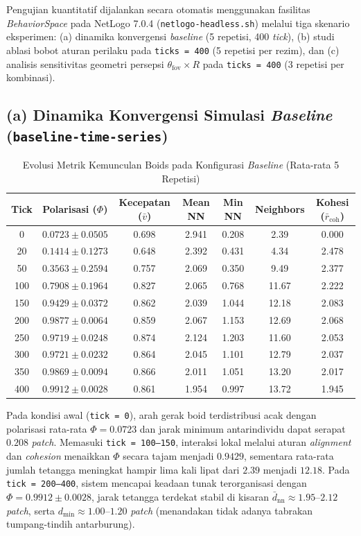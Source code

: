 \documentclass[11pt,a4paper]{article}
\begin{document}
Pengujian kuantitatif dijalankan secara otomatis menggunakan fasilitas \textit{BehaviorSpace} pada NetLogo 7.0.4 (\texttt{netlogo-headless.sh}) melalui tiga skenario eksperimen: (a) dinamika konvergensi \textit{baseline} (5 repetisi, 400 \textit{tick}), (b) studi ablasi bobot aturan perilaku pada \texttt{ticks = 400} (5 repetisi per rezim), dan (c) analisis sensitivitas geometri persepsi $\theta_{\text{fov}} \times R$ pada \texttt{ticks = 400} (3 repetisi per kombinasi).

\subsection*{(a) Dinamika Konvergensi Simulasi \textit{Baseline} (\texttt{baseline-time-series})}
\begin{table}[H]
\centering
\small
\setlength{\tabcolsep}{5pt}
\begin{tabular}{ccccccc}
\toprule
\textbf{Tick} & \textbf{Polarisasi ($\Phi$)} & \textbf{Kecepatan ($\bar{v}$)} & \textbf{Mean NN} & \textbf{Min NN} & \textbf{Neighbors} & \textbf{Kohesi ($\bar{r}_{\text{coh}}$)} \\
\midrule
0   & $0.0723 \pm 0.0505$ & 0.698 & 2.941 & 0.208 & 2.39  & 0.000 \\
20  & $0.1414 \pm 0.1273$ & 0.648 & 2.392 & 0.431 & 4.34  & 2.478 \\
50  & $0.3563 \pm 0.2594$ & 0.757 & 2.069 & 0.350 & 9.49  & 2.377 \\
100 & $0.7908 \pm 0.1964$ & 0.827 & 2.065 & 0.768 & 11.67 & 2.222 \\
150 & $0.9429 \pm 0.0372$ & 0.862 & 2.039 & 1.044 & 12.18 & 2.083 \\
200 & $0.9877 \pm 0.0064$ & 0.859 & 2.067 & 1.153 & 12.69 & 2.068 \\
250 & $0.9719 \pm 0.0248$ & 0.874 & 2.124 & 1.203 & 11.60 & 2.053 \\
300 & $0.9721 \pm 0.0232$ & 0.864 & 2.045 & 1.101 & 12.79 & 2.037 \\
350 & $0.9869 \pm 0.0094$ & 0.866 & 2.011 & 1.051 & 13.20 & 2.017 \\
400 & $0.9912 \pm 0.0028$ & 0.861 & 1.954 & 0.997 & 13.72 & 1.945 \\
\bottomrule
\end{tabular}
\caption{Evolusi Metrik Kemunculan Boids pada Konfigurasi \textit{Baseline} (Rata-rata 5 Repetisi)}
\label{tab:baseline}
\end{table}

Pada kondisi awal (\texttt{tick = 0}), arah gerak boid terdistribusi acak dengan polarisasi rata-rata $\Phi = 0.0723$ dan jarak minimum antarindividu dapat serapat $0.208$ \textit{patch}. Memasuki \texttt{tick = 100--150}, interaksi lokal melalui aturan \textit{alignment} dan \textit{cohesion} menaikkan $\Phi$ secara tajam menjadi $0.9429$, sementara rata-rata jumlah tetangga meningkat hampir lima kali lipat dari $2.39$ menjadi $12.18$. Pada \texttt{tick = 200--400}, sistem mencapai keadaan tunak terorganisasi dengan $\Phi = 0.9912 \pm 0.0028$, jarak tetangga terdekat stabil di kisaran $\bar{d}_{\text{nn}} \approx 1.95$--$2.12$ \textit{patch}, serta $d_{\min} \approx 1.00$--$1.20$ \textit{patch} (menandakan tidak adanya tabrakan tumpang-tindih antarburung).
\end{document}
